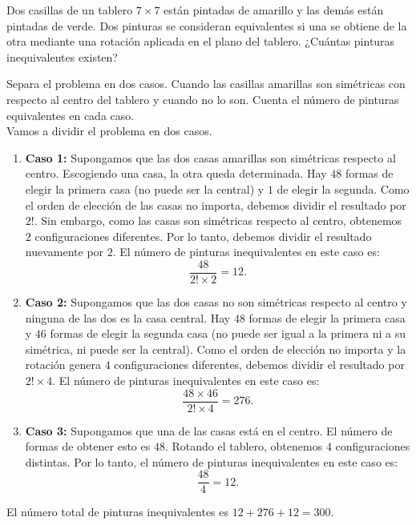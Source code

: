 \documentclass[11pt]{scrartcl}
\begin{document}
\begin{problem}[AIME 1996] Dos casillas de un tablero \(7\times 7\) están pintadas de amarillo y las demás están pintadas de verde. Dos pinturas se consideran equivalentes si una se obtiene de la otra mediante una rotación aplicada en el plano del tablero. ¿Cuántas pinturas inequivalentes existen?
\begin{hint}
Separa el problema en dos casos. Cuando las casillas amarillas son simétricas con respecto al centro del tablero y cuando no lo son. Cuenta el número de pinturas equivalentes en cada caso.\\
Vamos a dividir el problema en dos casos.

\begin{enumerate}
    \item \textbf{Caso 1:} Supongamos que las dos casas amarillas son simétricas respecto al centro. Escogiendo una casa, la otra queda determinada. Hay $48$ formas de elegir la primera casa (no puede ser la central) y $1$ de elegir la segunda. Como el orden de elección de las casas no importa, debemos dividir el resultado por $2!$. Sin embargo, como las casas son simétricas respecto al centro, obtenemos $2$ configuraciones diferentes. Por lo tanto, debemos dividir el resultado nuevamente por $2$. El número de pinturas inequivalentes en este caso es:
    \[
    \frac{48}{2! \times 2} = 12.
    \]
    
    \item \textbf{Caso 2:} Supongamos que las dos casas no son simétricas respecto al centro y ninguna de las dos es la casa central. Hay $48$ formas de elegir la primera casa y $46$ formas de elegir la segunda casa (no puede ser igual a la primera ni a su simétrica, ni puede ser la central). Como el orden de elección no importa y la rotación genera $4$ configuraciones diferentes, debemos dividir el resultado por $2! \times 4$. El número de pinturas inequivalentes en este caso es:
    \[
    \frac{48 \times 46}{2! \times 4} = 276.
    \]
    
    \item \textbf{Caso 3:} Supongamos que una de las casas está en el centro. El número de formas de obtener esto es $48$. Rotando el tablero, obtenemos $4$ configuraciones distintas. Por lo tanto, el número de pinturas inequivalentes en este caso es:
    \[
    \frac{48}{4} = 12.
    \]
\end{enumerate}

El número total de pinturas inequivalentes es $12 + 276 + 12 = 300$.
\end{hint}
\end{problem}
\end{document}

